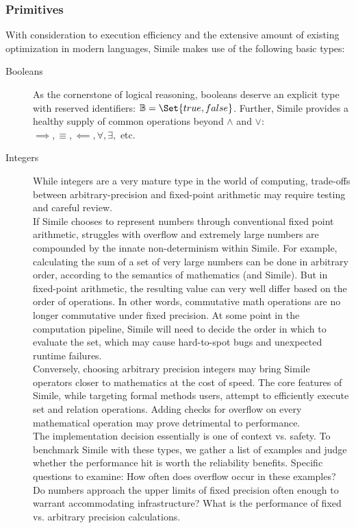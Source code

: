 \subsubsection{Primitives}
With consideration to execution efficiency and the extensive amount of existing optimization in modern languages, Simile makes use of the following basic types:
\begin{description}
    \item[Booleans] As the cornerstone of logical reasoning, booleans deserve an explicit type with reserved identifiers: $\mathbb{B} = \Set{true, false}$. Further, Simile provides a healthy supply of common operations beyond $\land$ and $\lor$: $\implies, \equiv, \impliedby, \forall, \exists,$ etc.
    \item[Integers] While integers are a very mature type in the world of computing, trade-offs between arbitrary-precision and fixed-point arithmetic may require testing and careful review.
    \\
    If Simile chooses to represent numbers through conventional fixed point arithmetic, struggles with overflow and extremely large numbers are compounded by the innate non-determinism within Simile. For example, calculating the sum of a set of very large numbers can be done in arbitrary order, according to the semantics of mathematics (and Simile). But in fixed-point arithmetic, the resulting value can very well differ based on the order of operations. In other words, commutative math operations are no longer commutative under fixed precision. At some point in the computation pipeline, Simile will need to decide the order in which to evaluate the set, which may cause hard-to-spot bugs and unexpected runtime failures.
    \\
    Conversely, choosing arbitrary precision integers may bring Simile operators closer to mathematics at the cost of speed. The core features of Simile, while targeting formal methods users, attempt to efficiently execute set and relation operations. Adding checks for overflow on every mathematical operation may prove detrimental to performance.
    \\
    The implementation decision essentially is one of context vs. safety. To benchmark Simile with these types, we gather a list of examples and judge whether the performance hit is worth the reliability benefits. Specific questions to examine: How often does overflow occur in these examples? Do numbers approach the upper limits of fixed precision often enough to warrant accommodating infrastructure? What is the performance of fixed vs. arbitrary precision calculations.

\end{description}
